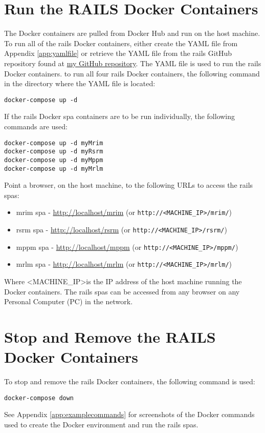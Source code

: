 \section{Run the RAILS Docker Containers}
\label{sec:railsdockercontainers}
The Docker containers are pulled from Docker Hub and run on the host machine. To run all of the \gls{rails} Docker containers, either create the YAML file from Appendix \ref{app:yamlfile} or retrieve the YAML file from the \gls{rails} GitHub repository found at \href{https://github.com/djbristow/RAILS/tree/master/Docker%20Based}{my GitHub repository}. The YAML file is used to run the \gls{rails} Docker containers.  
to run all four \gls{rails} Docker containers, the following command in the directory where the YAML file is located:
\begin{verbatim}
docker-compose up -d
\end{verbatim}
If the \gls{rails} Docker \gls{spa} containers are to be run individually, the following commands are used:
\begin{verbatim}
docker-compose up -d myMrim
docker-compose up -d myRsrm
docker-compose up -d myMppm
docker-compose up -d myMrlm
\end{verbatim}
Point a browser, on the host machine, to the following URLs to access the \gls{rails} \glspl{spa}:
\begin{itemize}
    \item \gls{mrim} \gls{spa} - \href{http://localhost/mrim}{http://localhost/mrim} (or \texttt{http://\textless MACHINE\_IP\textgreater /mrim/})
    \item \gls{rsrm} \gls{spa} - \href{http://localhost/rsrm}{http://localhost/rsrm} (or \texttt{http://\textless MACHINE\_IP\textgreater /rsrm/})
    \item \gls{mppm} \gls{spa} - \href{http://localhost/mppm}{http://localhost/mppm} (or \texttt{http://\textless MACHINE\_IP\textgreater /mppm/})
    \item \gls{mrlm} \gls{spa} - \href{http://localhost/mrlm}{http://localhost/mrlm} (or \texttt{http://\textless MACHINE\_IP\textgreater /mrlm/})
\end{itemize}
Where \textless MACHINE\_IP\textgreater is the IP address of the host machine running the Docker containers. The \gls{rails} \glspl{spa} can be accessed from any browser on any Personal Computer (PC) in the network.
\section{Stop and Remove the RAILS Docker Containers}
\label{sec:stopremoverailsdockercontainers}
To stop and remove the \gls{rails} Docker containers, the following command is used:
\begin{verbatim}
docker-compose down
\end{verbatim}

See Appendix \ref{app:examplecommands} for screenshots of the Docker commands used to create the Docker environment and run the \gls{rails} \glspl{spa}.